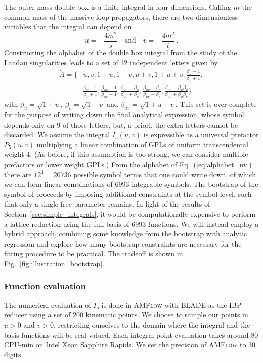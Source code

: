 \documentclass[a4paper,11pt]{article}
\begin{document}
The outer-mass double-box is a finite integral in four dimensions. Calling $m$ the common mass of the massive loop propagators, there are two dimensionless variables that the integral can depend on
\begin{equation} \label{eq:u_and_v_def}
    u = - \frac{4 m^2}{s} \quad \text{and} \quad v = - \frac{4 m^2}{t}\,. 
\end{equation}
Constructing the alphabet of the double box integral from the study of the Landau singularities leads to a set of 12 independent letters \cite{Hannesdottir:2024hke} given by 
\begin{align} \label{eq:alphabet_uv} \nonumber
    \tilde{A} = \Big\{& u, v, 1+u, 1+v, u+v, 1+u+v, \frac{\beta_u-1}{\beta_u+1} ,\\ & \frac{\beta_v-1}{\beta_v+1},\frac{\beta_{uv}-1}{\beta_{uv}+1},\frac{\beta_{uv}-\beta_u}{\beta_{uv}+\beta_u},\frac{\beta_{uv}-\beta_v}{\beta_{uv}+\beta_v} ,\frac{\beta_{uv}-\beta_u\beta_v}{\beta_{uv}+\beta_u\beta_v} \Big\} \, 
\end{align}
with $\beta_u = \sqrt{1+u}$, $\beta_v = \sqrt{1+v}$ and $\beta_{uv} = \sqrt{1+u+v}$. This set is over-complete for the purpose of writing down the final analytical expression, whose symbol depends only on 9 of those letters, but, a priori, the extra letters cannot be discarded. We assume the integral $I_5(u,v)$ is expressible as a universal prefactor $P_5(u,v)$ multiplying a linear combination of GPLs of uniform transcendental weight 4. (As before, if this assumption is too strong, we can consider multiple prefactors or lower weight GPLs.)
From the alphabet of Eq.~(\ref{eq:alphabet_uv}) there are  $12^4=20736$ possible symbol terms that one could write down, of which we can form linear combinations of 6993 integrable symbols. The bootstrap of the symbol of \cite{Hannesdottir:2024hke} proceeds by imposing additional constraints at the symbol level, such that only a single free parameter remains. In light of the results of Section~\ref{sec:simple_integrals}, it would be computationally expensive to perform a lattice reduction using the full basis of 6993 functions. We will instead employ a hybrid approach, combining some knowledge from the bootstrap with analytic regression and explore how many bootstrap constraints are necessary for the fitting procedure to be practical. The tradeoff is shown in Fig.~\ref{fig:illustration_bootstrap}.

\subsubsection{Function evaluation}
The numerical evaluation of $I_5$ is done in \textsc{AMFlow} with \textsc{BLADE} as the IBP reducer using a set of 200 kinematic points. We choose to sample our points in $u>0$ and $v>0$, restricting ourselves to the domain where the integral and the basis functions will be real-valued. Each integral point evaluation takes around 80 CPU-min on Intel Xeon Sapphire Rapids. We set the precision of \textsc{AMFlow} to 30 digits. 
\end{document}
